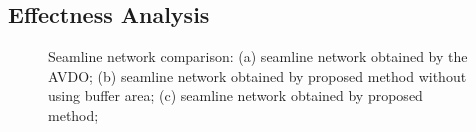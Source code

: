 \documentclass[journal]{IEEEtran}
\begin{document}
\subsection{Effectness Analysis}
\begin{figure}[!t]
	\centering
	\caption{Seamline network comparison: (a) seamline network obtained by the AVDO; (b) seamline network obtained by proposed method without using buffer area; (c) seamline network obtained by proposed method;  }
	\label{fig:mosaic-overall-performance}
\end{figure}
\end{document}
